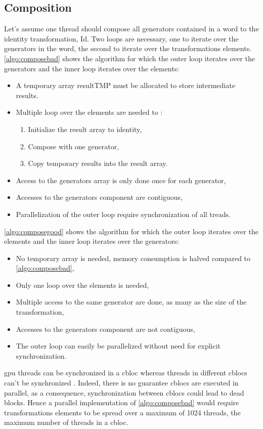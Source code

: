 {\subsection{Composition}
\label{part:compose}
Let's assume one thread should compose all generators contained in a word to the identity transformation, Id. 
Two loops are necessary, one to iterate over the generators in the word, the second to iterate over the transformations elements.
\autoref{algo:composebad} shows the algorithm for which the outer loop iterates over the generators and the inner loop iterates over the elements:
\begin{itemize}
\item A temporary array resultTMP must be allocated to store intermediate results.
\item Multiple loop over the elements are needed to :
\begin{enumerate}
 \item Initialize the result array to identity,
 \item Compose with one generator,
 \item Copy temporary results into the result array.
 \end{enumerate}
\item Access to the generators array is only done once for each generator,
 \item Accesses to the generators component are contiguous,
 \item Parallelization of the outer loop require synchronization of all treads.
\end{itemize}
\autoref{algo:composegood} shows the algorithm for which the outer loop iterates over the elements and the inner loop iterates over the generators:
\begin{itemize}
 \item No temporary array is needed, memory consumption is halved compared to \autoref{algo:composebad},
 \item Only one loop over the elements is needed,
 \item Multiple access to the same generator are done, as many as the size of the transformation,
 \item Accesses to the generators component are not contiguous,
 \item The outer loop can easily be parallelized without need for explicit synchronization.
\end{itemize}
\gls{gpu} threads can be synchronized in a \gls{cbloc} whereas threads in different \glspl{cbloc} can't be synchronized \cite{doccuda}. 
Indeed, there is no guarantee \glspl{cbloc} are executed in parallel, as a consequence, synchronization between \glspl{cbloc} could lead to dead blocks. 
Hence a parallel implementation of \autoref{algo:composebad} would require transformations elements to be spread over a maximum of 1024 threads, the maximum number of threads in a \gls{cbloc}.

}
